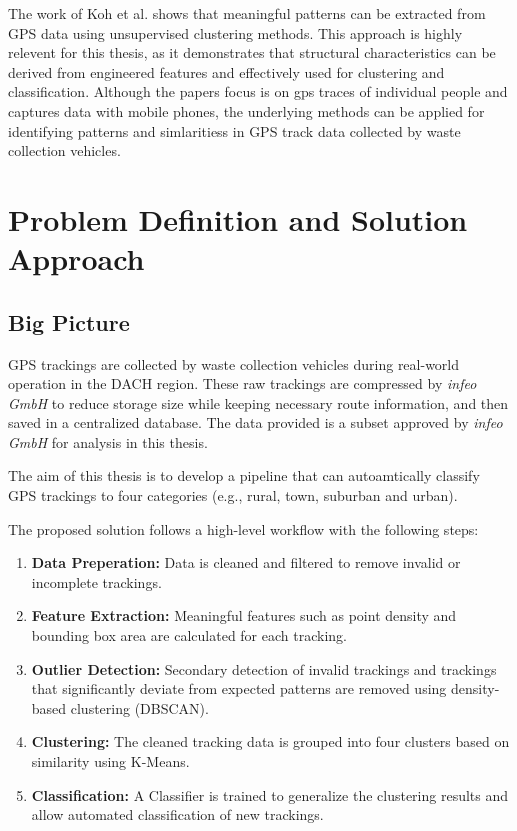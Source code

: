 \documentclass[a4paper,12pt,twoside]{scrreprt}
\begin{document}
The work of Koh et al. shows that meaningful patterns can be extracted from GPS
data using unsupervised clustering methods. This approach is highly relevent
for this thesis,
as it demonstrates that structural characteristics can be derived from
engineered features
and effectively used for clustering and classification. Although the papers
focus is on
gps traces of individual people and captures data with mobile phones, the
underlying methods can
be applied for identifying patterns and simlaritiess in GPS track data
collected by
waste collection vehicles.

\chapter{Problem Definition and Solution Approach}

\section{Big Picture}

GPS trackings are collected by waste collection vehicles during real-world
operation in the DACH region.
These raw trackings are compressed by \textit{infeo GmbH} to reduce storage
size while
keeping necessary route information, and then saved in a centralized database.
The data provided is a subset approved by \textit{infeo GmbH} for analysis in
this thesis.

The aim of this thesis is to develop a pipeline that can autoamtically classify
GPS trackings to four categories (e.g., rural, town, suburban and urban).

The proposed solution follows a high-level workflow with the following steps:

\begin{enumerate}
  \item \textbf{Data Preperation:} Data is cleaned and filtered to remove
        invalid or incomplete trackings.
  \item \textbf{Feature Extraction:} Meaningful features such as point density
        and bounding box area are calculated for each tracking.
  \item \textbf{Outlier Detection:} Secondary detection of invalid trackings
        and trackings that significantly deviate from expected patterns are
        removed
        using density-based clustering (DBSCAN).
  \item \textbf{Clustering:} The cleaned tracking data is grouped into four
        clusters based on similarity using K-Means.
  \item \textbf{Classification:} A Classifier is trained to generalize the
        clustering results and allow automated classification of new trackings.
\end{enumerate}
\end{document}

